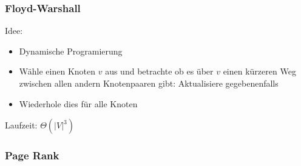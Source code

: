 \documentclass[a4paper]{article}
\begin{document}
	\subsubsection{Floyd-Warshall}
		Idee:
		\begin{itemize}
		  \item Dynamische Programierung
		  \item Wähle einen Knoten $v$ aus und betrachte ob es über $v$ einen kürzeren Weg zwischen allen andern Knotenpaaren gibt: Aktualisiere gegebenenfalls 
		  \item Wiederhole dies für alle Knoten
		\end{itemize}
		Laufzeit: $\Theta(|V|^3)$
	\subsubsection{Page Rank}
	
\end{document}

